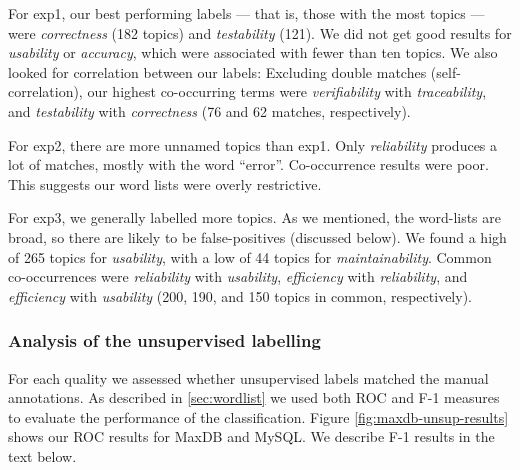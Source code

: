 \documentclass[]{sig-alternate}
\begin{document}
For \textsf{exp1}, our best performing 
labels --- that is, those with the most topics --- were
\emph{correctness} (182 topics) and \emph{testability} (121). 
We did not get good results for \emph{usability} or \emph{accuracy}, which were associated with fewer than ten topics. 
We also looked for correlation between our labels: Excluding double matches (self-correlation), our highest co-occurring terms were \emph{verifiability} with \emph{traceability}, and \emph{testability} with \emph{correctness} (76 and 62 matches, respectively).

For \textsf{exp2}, there are more unnamed topics than \textsf{exp1}. 
Only \emph{reliability} produces a lot of matches, mostly with the word ``error''. 
Co-occurrence results were poor. This suggests our word lists were overly restrictive.

For \textsf{exp3}, we generally labelled more topics. 
As we mentioned, the word-lists are broad, so there are likely to be false-positives (discussed below). 
We found a high of 265 topics for \emph{usability}, with a low of 44 topics for \emph{maintainability}. 
Common co-occurrences were \emph{reliability} with \emph{usability}, \emph{efficiency} with \emph{reliability}, and \emph{efficiency} with \emph{usability} (200, 190, and 150 topics in common, respectively). 



\subsubsection{Analysis of the unsupervised labelling} %
For each quality we assessed whether unsupervised labels matched the manual annotations. %
As described in \ref{sec:wordlist} we used both ROC and F-1 measures to evaluate the performance of the classification.
Figure \ref{fig:maxdb-unsup-results} shows our ROC results for MaxDB and MySQL. We describe F-1 results in the text below.
\end{document}
